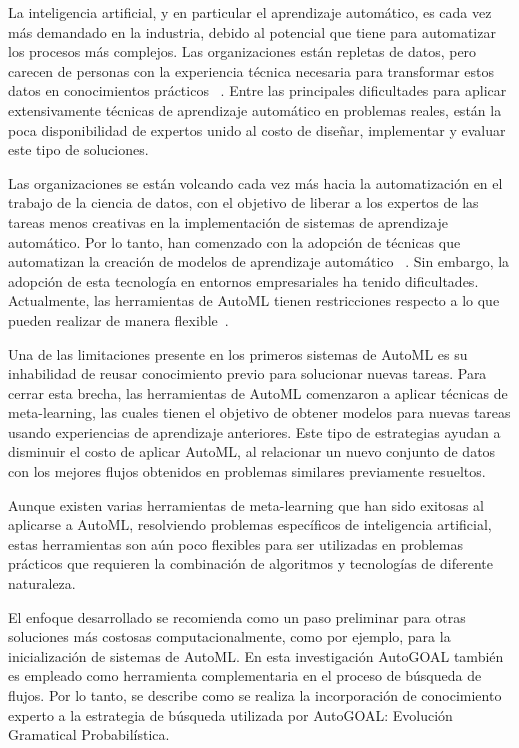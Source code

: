 \begin{conclusions}
    La inteligencia artificial, y en particular el aprendizaje automático, es
    cada vez más demandado en la industria, debido al potencial que tiene para
    automatizar los procesos más complejos. Las organizaciones están repletas
    de datos, pero carecen de personas con la experiencia técnica necesaria
    para transformar estos datos en conocimientos prácticos
    ~. Entre las principales dificultades para
    aplicar extensivamente técnicas de aprendizaje automático en problemas
    reales, están la poca disponibilidad de expertos unido al costo de diseñar,
    implementar y evaluar este tipo de soluciones.

    Las organizaciones se están volcando cada vez más hacia la automatización
    en el trabajo de la ciencia de datos, con el objetivo de liberar a los
    expertos de las tareas menos creativas en la implementación de sistemas de
    aprendizaje automático. Por lo tanto, han comenzado con la adopción de
    técnicas que automatizan la creación de modelos de aprendizaje automático
    ~. Sin embargo, la adopción de
    esta tecnología en entornos empresariales ha tenido dificultades.
    Actualmente, las herramientas de AutoML tienen restricciones respecto a lo
    que pueden realizar de manera flexible~.

    Una de las limitaciones presente en los primeros sistemas de AutoML es su
    inhabilidad de reusar conocimiento previo para solucionar nuevas tareas.
    Para cerrar esta brecha, las herramientas de AutoML comenzaron a aplicar
    técnicas de meta-learning, las cuales tienen el objetivo de obtener modelos
    para nuevas tareas usando experiencias de aprendizaje anteriores. Este
    tipo de estrategias ayudan a disminuir el costo de aplicar AutoML, al
    relacionar un nuevo conjunto de datos con los mejores flujos obtenidos en
    problemas similares previamente resueltos.

    Aunque existen varias herramientas de meta-learning que han sido exitosas
    al aplicarse a AutoML, resolviendo problemas específicos de inteligencia
    artificial, estas herramientas son aún poco flexibles para ser utilizadas
    en problemas prácticos que requieren la combinación de algoritmos y
    tecnologías de diferente naturaleza.

    El enfoque desarrollado se recomienda como un paso preliminar para otras
    soluciones más costosas computacionalmente, como por ejemplo, para la
    inicialización de sistemas de AutoML. En esta investigación AutoGOAL
    también es empleado como herramienta complementaria en el proceso de
    búsqueda de flujos. Por lo tanto, se describe como se realiza la
    incorporación de conocimiento experto a la estrategia de búsqueda utilizada
    por AutoGOAL: Evolución Gramatical Probabilística.


\end{conclusions}
